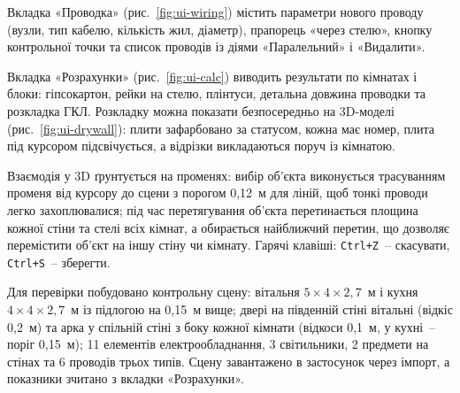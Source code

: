 
Вкладка «Проводка» (рис.~\ref{fig:ui-wiring}) містить параметри нового проводу (вузли, тип кабелю, кількість жил, діаметр), прапорець «через стелю», кнопку контрольної точки та список проводів із діями «Паралельний» і «Видалити».


Вкладка «Розрахунки» (рис.~\ref{fig:ui-calc}) виводить результати по кімнатах і блоки: гіпсокартон, рейки на стелю, плінтуси, детальна довжина проводки та розкладка ГКЛ. Розкладку можна показати безпосередньо на 3D-моделі (рис.~\ref{fig:ui-drywall}): плити зафарбовано за статусом, кожна має номер, плита під курсором підсвічується, а відрізки викладаються поруч із кімнатою.



Взаємодія у 3D ґрунтується на променях: вибір об'єкта виконується трасуванням променя від курсору до сцени з порогом 0,12~м для ліній, щоб тонкі проводи легко захоплювалися; під час перетягування об'єкта перетинається площина кожної стіни та стелі всіх кімнат, а обирається найближчий перетин, що дозволяє перемістити об'єкт на іншу стіну чи кімнату. Гарячі клавіші: \texttt{Ctrl+Z}~-- скасувати, \texttt{Ctrl+S}~-- зберегти.



Для перевірки побудовано контрольну сцену: вітальня $5\times4\times2{,}7$~м і кухня $4\times4\times2{,}7$~м із підлогою на 0,15~м вище; двері на південній стіні вітальні (відкіс 0,2~м) та арка у спільній стіні з боку кожної кімнати (відкоси 0,1~м, у кухні~-- поріг 0,15~м); 11 елементів електрообладнання, 3 світильники, 2 предмети на стінах та 6 проводів трьох типів. Сцену завантажено в застосунок через імпорт, а показники зчитано з вкладки «Розрахунки».


